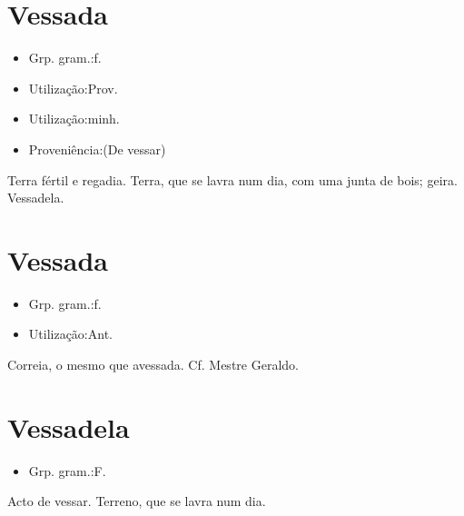 \documentclass{article}
\begin{document}
\section{Vessada}
\begin{itemize}
\item {Grp. gram.:f.}
\end{itemize}
\begin{itemize}
\item {Utilização:Prov.}
\end{itemize}
\begin{itemize}
\item {Utilização:minh.}
\end{itemize}
\begin{itemize}
\item {Proveniência:(De \textunderscore vessar\textunderscore )}
\end{itemize}
Terra fértil e regadia.
Terra, que se lavra num dia, com uma junta de bois; geira.
Vessadela.
\section{Vessada}
\begin{itemize}
\item {Grp. gram.:f.}
\end{itemize}
\begin{itemize}
\item {Utilização:Ant.}
\end{itemize}
Correia, o mesmo que \textunderscore avessada\textunderscore . Cf. Mestre Geraldo.
\section{Vessadela}
\begin{itemize}
\item {Grp. gram.:F.}
\end{itemize}
Acto de vessar.
Terreno, que se lavra num dia.
\end{document}
